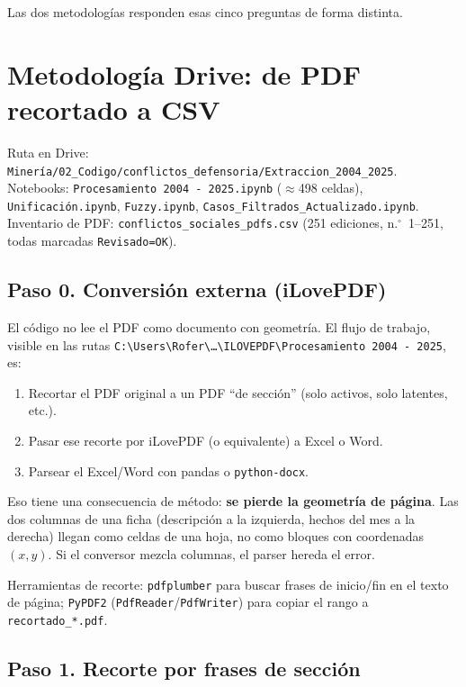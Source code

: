 \documentclass[11pt,a4paper]{article}
\begin{document}
Las dos metodologías responden esas cinco preguntas de forma distinta.

\section{Metodología Drive: de PDF recortado a CSV}

Ruta en Drive: \texttt{Minería/02\_Codigo/conflictos\_defensoria/Extraccion\_2004\_2025}. Notebooks: \texttt{Procesamiento 2004 - 2025.ipynb} ($\approx$498 celdas), \texttt{Unificación.ipynb}, \texttt{Fuzzy.ipynb}, \texttt{Casos\_Filtrados\_Actualizado.ipynb}. Inventario de PDF: \texttt{conflictos\_sociales\_pdfs.csv} (251 ediciones, n.$^\circ$~1--251, todas marcadas \texttt{Revisado=OK}).

\subsection{Paso 0. Conversión externa (iLovePDF)}

El código no lee el PDF como documento con geometría. El flujo de trabajo, visible en las rutas \texttt{C:\textbackslash Users\textbackslash Rofer\textbackslash \ldots\textbackslash ILOVEPDF\textbackslash Procesamiento 2004 - 2025}, es:

\begin{enumerate}
  \item Recortar el PDF original a un PDF ``de sección'' (solo activos, solo latentes, etc.).
  \item Pasar ese recorte por iLovePDF (o equivalente) a Excel o Word.
  \item Parsear el Excel/Word con pandas o \texttt{python-docx}.
\end{enumerate}

Eso tiene una consecuencia de método: \textbf{se pierde la geometría de página}. Las dos columnas de una ficha (descripción a la izquierda, hechos del mes a la derecha) llegan como celdas de una hoja, no como bloques con coordenadas $(x,y)$. Si el conversor mezcla columnas, el parser hereda el error.

Herramientas de recorte: \texttt{pdfplumber} para buscar frases de inicio/fin en el texto de página; \texttt{PyPDF2} (\texttt{PdfReader}/\texttt{PdfWriter}) para copiar el rango a \texttt{recortado\_*.pdf}.

\subsection{Paso 1. Recorte por frases de sección}
\end{document}
